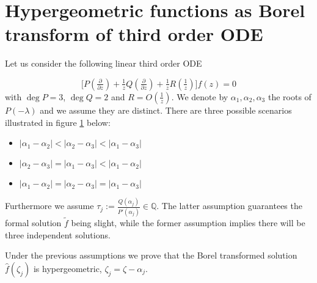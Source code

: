 \documentclass[11pt,a4paper,twoside,leqno,noamsfonts]{amsart}
\numberwithin{equation}{section}
\begin{document}
\section{Hypergeometric functions as Borel transform of third order ODE}


Let us consider the following linear third order ODE

\begin{equation}\label{eq3}
\big[P(\tfrac{\partial}{\partial z})+\tfrac{1}{z}Q(\tfrac{\partial}{\partial z})+\tfrac{1}{z}R(\tfrac{1}{z})\big]f(z)=0
\end{equation}
with $\deg P=3$, $\deg Q=2$ and $R=O(\tfrac{1}{z})$. We denote by $\alpha_1,\alpha_2,\alpha_3$ the roots of $P(-\lambda)$ and we assume they are distinct. There are three possible scenarios illustrated in figure \ref{fig3} below:
\begin{itemize}
\item $|\alpha_1-\alpha_2|<|\alpha_2-\alpha_3|<|\alpha_1-\alpha_3|$
\item $|\alpha_2-\alpha_3|=|\alpha_1-\alpha_3|<|\alpha_1-\alpha_2|$
\item $|\alpha_1-\alpha_2|=|\alpha_2-\alpha_3|=|\alpha_1-\alpha_3|$
\end{itemize}

\begin{figure}[h]\label{fig3}
\end{figure}  

Furthermore we assume $\tau_j:=\frac{Q(\alpha_j)}{P'(\alpha_j)}\in\mathbb{Q}$. The latter assumption guarantees the formal solution $\tilde{f}$ being slight, while the former assumption implies there will be three independent solutions. 

Under the previous assumptions we prove that the Borel transformed solution $\hat{f}(\zeta_j)$ is hypergeometric, $\zeta_j=\zeta-\alpha_j$.
\end{document}
